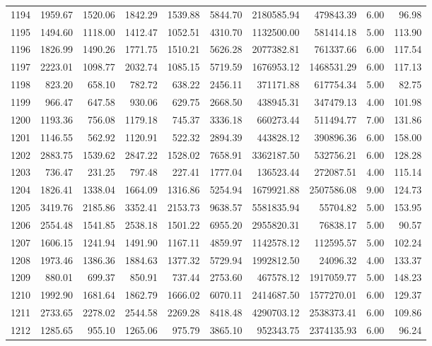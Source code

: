 \begin{tabular}{lrrrrrrrrr}
1194 & 1959.67 & 1520.06 & 1842.29 & 1539.88 & 5844.70 & 2180585.94 & 479843.39 & 6.00 & 96.98 \\
1195 & 1494.60 & 1118.00 & 1412.47 & 1052.51 & 4310.70 & 1132500.00 & 581414.18 & 5.00 & 113.90 \\
1196 & 1826.99 & 1490.26 & 1771.75 & 1510.21 & 5626.28 & 2077382.81 & 761337.66 & 6.00 & 117.54 \\
1197 & 2223.01 & 1098.77 & 2032.74 & 1085.15 & 5719.59 & 1676953.12 & 1468531.29 & 6.00 & 117.13 \\
1198 & 823.20 & 658.10 & 782.72 & 638.22 & 2456.11 & 371171.88 & 617754.34 & 5.00 & 82.75 \\
1199 & 966.47 & 647.58 & 930.06 & 629.75 & 2668.50 & 438945.31 & 347479.13 & 4.00 & 101.98 \\
1200 & 1193.36 & 756.08 & 1179.18 & 745.37 & 3336.18 & 660273.44 & 511494.77 & 7.00 & 131.86 \\
1201 & 1146.55 & 562.92 & 1120.91 & 522.32 & 2894.39 & 443828.12 & 390896.36 & 6.00 & 158.00 \\
1202 & 2883.75 & 1539.62 & 2847.22 & 1528.02 & 7658.91 & 3362187.50 & 532756.21 & 6.00 & 128.28 \\
1203 & 736.47 & 231.25 & 797.48 & 227.41 & 1777.04 & 136523.44 & 272087.51 & 4.00 & 115.14 \\
1204 & 1826.41 & 1338.04 & 1664.09 & 1316.86 & 5254.94 & 1679921.88 & 2507586.08 & 9.00 & 124.73 \\
1205 & 3419.76 & 2185.86 & 3352.41 & 2153.73 & 9638.57 & 5581835.94 & 55704.82 & 5.00 & 153.95 \\
1206 & 2554.48 & 1541.85 & 2538.18 & 1501.22 & 6955.20 & 2955820.31 & 76838.17 & 5.00 & 90.57 \\
1207 & 1606.15 & 1241.94 & 1491.90 & 1167.11 & 4859.97 & 1142578.12 & 112595.57 & 5.00 & 102.24 \\
1208 & 1973.46 & 1386.36 & 1884.63 & 1377.32 & 5729.94 & 1992812.50 & 24096.32 & 4.00 & 133.37 \\
1209 & 880.01 & 699.37 & 850.91 & 737.44 & 2753.60 & 467578.12 & 1917059.77 & 5.00 & 148.23 \\
1210 & 1992.90 & 1681.64 & 1862.79 & 1666.02 & 6070.11 & 2414687.50 & 1577270.01 & 6.00 & 129.37 \\
1211 & 2733.65 & 2278.02 & 2544.58 & 2269.28 & 8418.48 & 4290703.12 & 2538373.41 & 6.00 & 109.86 \\
1212 & 1285.65 & 955.10 & 1265.06 & 975.79 & 3865.10 & 952343.75 & 2374135.93 & 6.00 & 96.24 \\

\end{tabular}
